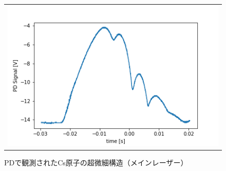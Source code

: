 \documentclass[uplatex, dvipdfmx, a4paper, report, papersize, 11pt]{jsbook}
\begin{document}
\begin{figure}[b]
  \centering
    \begin{tabular}{c}

      \begin{minipage}{1\hsize}
        \centering
          \includegraphics[keepaspectratio,  scale=0.8,  angle=0]
                          {figures/saturated-absorption/PD_Signal_Main.png}
                          \caption{PDで観測されたCs原子の超微細構造（メインレーザー）}
                          \label{PD_Signal_Main}
      \end{minipage}
  \end{tabular}
\end{figure}
\end{document}

